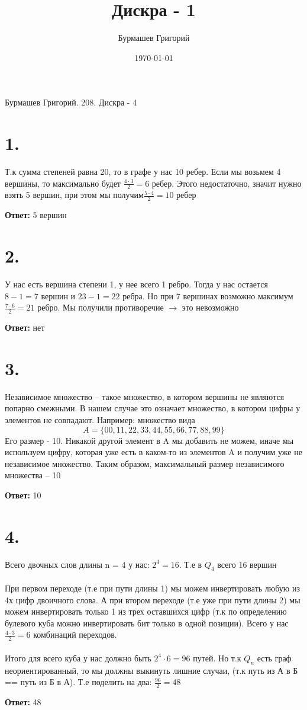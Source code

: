 \documentclass[a4paper,12pt]{article}
\author{Бурмашев Григорий}
\title{Дискра - 1}
\date{\today}
\begin{document}
\begin{center}
Бурмашев Григорий. 208. Дискра - 4
\end{center}
\section*{1.}
Т.к сумма степеней равна 20, то в графе у нас 10 ребер. Если мы возьмем 4 вершины, то максимально будет $\frac{4\cdot3}{2} = 6 $ ребер. Этого недостаточно, значит нужно взять 5 вершин, при этом мы получим$\frac{5\cdot 4}{2} = 10$ ребер
\begin{center}
\textbf{Ответ:} 5 вершин
\end{center}
\section*{2.}
У нас есть вершина степени 1, у нее всего 1 ребро. Тогда у нас остается $8-1 = 7$ вершин и $23-1 = 22$ ребра. Но при 7 вершинах возможно максимум $\frac{7\cdot6}{2} = 21$ ребро. Мы получили противоречие $\rightarrow$ это невозможно
\begin{center}
\textbf{Ответ:} нет
\end{center}
\section*{3.}
Независимое множество -- такое множество, в котором вершины не являются попарно смежными. В нашем случае это означает множество, в котором цифры у элементов не совпадают. Например: множество вида 
\[A = \{00, 11, 22, 33, 44, 55, 66, 77, 88, 99\}
\]
Его размер - 10. Никакой другой элемент в A мы добавить не можем, иначе мы используем цифру, которая уже есть в каком-то из элементов A и получим уже не независимое множество. Таким образом, максимальный размер независимого множества -- 10
\begin{center}
\textbf{Ответ:}  10
\end{center}
\section*{4.}
Всего двочных слов длины n = 4 у нас: $2^4 = 16$. Т.е в $Q_4$ всего 16 вершин
\\\\
При первом переходе (т.е при пути длины 1) мы можем инвертировать любую из 4х цифр двоичного слова. А при втором переходе (т.е уже при пути длины 2) мы можем инвертировать только 1 из трех оставшихся цифр (т.к по определению булевого куба можно инвертировать бит только в одной позиции). Всего у нас $\frac{4\cdot3}{2} = 6 $ комбинаций переходов.
\\\\
Итого для всего куба у нас должно быть $2^4 \cdot 6 = 96$ путей.  Но т.к $Q_n$ есть граф неориентированный, то мы должны выкинуть лишние случаи, (т.к путь из А в Б == путь из Б в А). Т.е поделить на два: $\frac{96}{2} = 48 $
\begin{center}
\textbf{Ответ:} 48 
\end{center}
\end{document}
